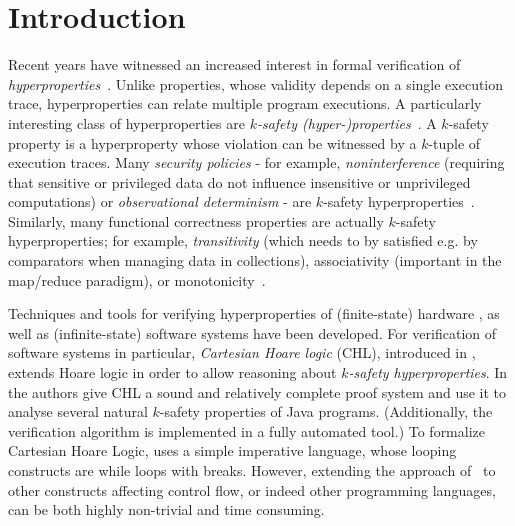 \section{Introduction}
Recent years have witnessed an increased interest in formal verification of
\emph{hyperproperties}~\cite{ClarksonS08}. Unlike properties, whose validity depends on a single
execution trace, hyperproperties can relate multiple program executions. A
particularly interesting class of hyperproperties are \emph{$k$-safety
  (hyper-)properties}~\cite{FinkbeinerHT19CanonicalKsafety,SousaD16,AgrawalB16RuntimeKSafetyHLTL,ClarksonS08}.
A $k$-safety property is a hyperproperty whose violation can be witnessed by a
$k$-tuple of execution traces.  Many \emph{security policies} - for example,
\emph{noninterference} (requiring that sensitive or privileged data do not influence
insensitive or unprivileged computations)
or \emph{observational determinism}
- are $k$-safety hyperproperties~\cite{}.
Similarly, many functional correctness properties are actually $k$-safety
hyperproperties; for example, \emph{transitivity} (which needs to by satisfied
e.g. by comparators when managing data in collections), associativity
(important in the map/reduce paradigm), or monotonicity~\cite{SousaD16}.


Techniques and tools for verifying hyperproperties of (finite-state) hardware
\cite{CoenenFST19,FinkbeinerRS15}, as well as (infinite-state) software
systems have been developed.  For verification of software systems in
particular, \emph{Cartesian Hoare logic} (CHL), introduced in \cite{SousaD16},
extends Hoare logic in order to allow reasoning about \emph{$k$-safety
  hyperproperties}. In \cite{SousaD16} the authors give
CHL a sound and relatively complete proof system and use it
to analyse several natural $k$-safety properties of Java
programs. (Additionally, the verification algorithm is implemented in a fully automated
tool.) To formalize Cartesian Hoare Logic, \cite{SousaD16} uses a simple
imperative language, whose looping constructs are while loops with
breaks. However, extending the approach of~\cite{SousaD16} to
other constructs affecting control flow, or indeed other programming
languages, can be both highly non-trivial and time consuming.



